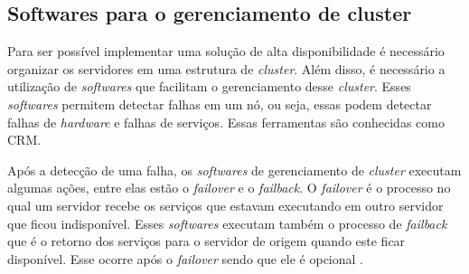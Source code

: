 




\subsection{Softwares para o gerenciamento de cluster}
\label{section:toolcluster}

Para ser possível implementar uma solução de alta disponibilidade é necessário organizar os servidores em uma estrutura de \textit{cluster}.
Além disso, é necessário a utilização de \textit{softwares} que facilitam o gerenciamento desse \textit{cluster}. Esses \textit{softwares} 
permitem detectar falhas em um nó, ou seja, essas podem detectar falhas de \textit{hardware} e falhas de serviços. 
Essas ferramentas são conhecidas como \ac{CRM}. 

Após a detecção de uma falha, os \textit{softwares} de gerenciamento de \textit{cluster} executam algumas ações, entre elas estão o 
\textit{failover} e o \textit{failback}. O \textit{failover} é o processo no qual um servidor recebe os serviços que estavam executando em outro 
servidor que ficou indisponível. Esses \textit{softwares} executam também o processo de \textit{failback} que é o retorno dos serviços 
para o servidor de origem quando este ficar disponível. Esse ocorre após o \textit{failover} sendo que ele é opcional \cite{bassan2008}.

